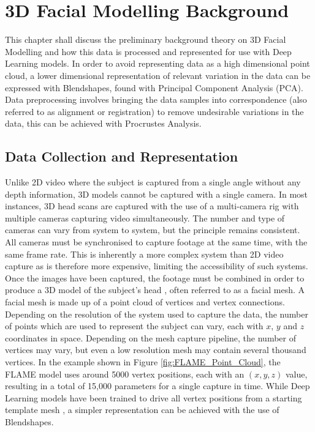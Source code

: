 \chapter{3D Facial Modelling Background}

This chapter shall discuss the preliminary background theory on 3D Facial Modelling and how this data is processed and represented for use with Deep Learning models.
In order to avoid representing data as a high dimensional point cloud, a lower dimensional representation of relevant variation in the data can be expressed with Blendshapes, found with Principal Component Analysis (PCA).
Data preprocessing involves bringing the data samples into correspondence (also referred to as alignment or registration) to remove undesirable variations in the data, this can be achieved with Procrustes Analysis.

\section{Data Collection and Representation}
Unlike 2D video where the subject is captured from a single angle without any depth information, 3D models cannot be captured with a single camera.
In most instances, 3D head scans are captured with the use of a multi-camera rig with multiple cameras capturing video simultaneously.
The number and type of cameras can vary from system to system, but the principle remains consistent.
All cameras must be synchronised to capture footage at the same time, with the same frame rate.
This is inherently a more complex system than 2D video capture as is therefore more expensive, limiting the accessibility of such systems.  
Once the images have been captured, the footage must be combined in order to produce a 3D model of the subject's head \cite{Li2017}, often referred to as a facial mesh.
A facial mesh is made up of a point cloud of vertices and vertex connections.
Depending on the resolution of the system used to capture the data, the number of points which are used to represent the subject can vary, each with $x$, $y$ and $z$ coordinates in space.
Depending on the mesh capture pipeline, the number of vertices may vary, but even a low resolution mesh may contain several thousand vertices.
In the example shown in Figure \ref{fig:FLAME_Point_Cloud}, the FLAME model \cite{Li2017} uses around 5000 vertex positions, each with an $(x, y, z)$ value, resulting in a total of 15,000 parameters for a single capture in time.
While Deep Learning models have been trained to drive all vertex positions from a starting template mesh \cite{Karras2017a}, a simpler representation can be achieved with the use of Blendshapes.

